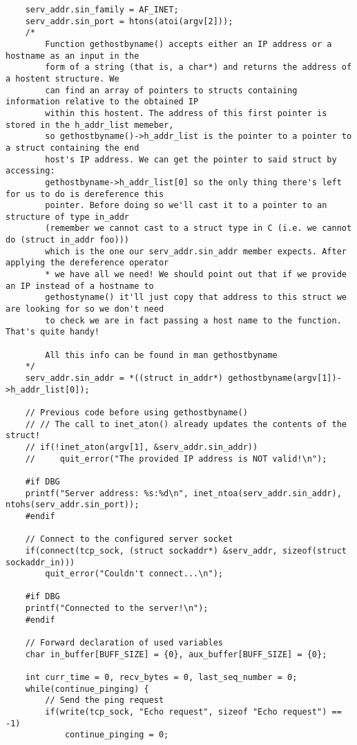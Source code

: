 \documentclass[landscape]{article}
\begin{document}
\begin{verbatim}
    serv_addr.sin_family = AF_INET;
    serv_addr.sin_port = htons(atoi(argv[2]));
    /*
        Function gethostbyname() accepts either an IP address or a hostname as an input in the
        form of a string (that is, a char*) and returns the address of a hostent structure. We
        can find an array of pointers to structs containing information relative to the obtained IP
        within this hostent. The address of this first pointer is stored in the h_addr_list memeber,
        so gethostbyname()->h_addr_list is the pointer to a pointer to a struct containing the end
        host's IP address. We can get the pointer to said struct by accessing:
        gethostbyname->h_addr_list[0] so the only thing there's left for us to do is dereference this
        pointer. Before doing so we'll cast it to a pointer to an structure of type in_addr
        (remember we cannot cast to a struct type in C (i.e. we cannot do (struct in_addr foo)))
        which is the one our serv_addr.sin_addr member expects. After applying the dereference operator
        * we have all we need! We should point out that if we provide an IP instead of a hostname to
        gethostyname() it'll just copy that address to this struct we are looking for so we don't need
        to check we are in fact passing a host name to the function. That's quite handy!

        All this info can be found in man gethostbyname
    */
    serv_addr.sin_addr = *((struct in_addr*) gethostbyname(argv[1])->h_addr_list[0]);

    // Previous code before using gethostbyname()
    // // The call to inet_aton() already updates the contents of the struct!
    // if(!inet_aton(argv[1], &serv_addr.sin_addr))
    //     quit_error("The provided IP address is NOT valid!\n");

    #if DBG
    printf("Server address: %s:%d\n", inet_ntoa(serv_addr.sin_addr), ntohs(serv_addr.sin_port));
    #endif

    // Connect to the configured server socket
    if(connect(tcp_sock, (struct sockaddr*) &serv_addr, sizeof(struct sockaddr_in)))
        quit_error("Couldn't connect...\n");

    #if DBG
    printf("Connected to the server!\n");
    #endif

    // Forward declaration of used variables
    char in_buffer[BUFF_SIZE] = {0}, aux_buffer[BUFF_SIZE] = {0};

    int curr_time = 0, recv_bytes = 0, last_seq_number = 0;
    while(continue_pinging) {
        // Send the ping request
        if(write(tcp_sock, "Echo request", sizeof "Echo request") == -1)
            continue_pinging = 0;


\end{verbatim}
\end{document}
